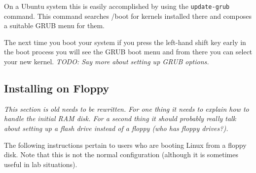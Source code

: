 \documentclass{article}
\newcommand{\command}[1]{\texttt{#1}}    %
\newcommand{\todo}[1]{\textit{TODO: #1}}
\begin{document}
On a Ubuntu system this is easily accomplished by using the \command{update-grub} command. This
command searches /boot for kernels installed there and composes a suitable GRUB menu for them.

The next time you boot your system if you press the left-hand shift key early in the boot
process you will see the GRUB boot menu and from there you can select your new kernel. \todo{Say
  more about setting up GRUB options.}

\subsection{Installing on Floppy}

\textit{This section is old needs to be rewritten. For one thing it needs to explain how to
  handle the initial RAM disk. For a second thing it should probably really talk about setting
  up a flash drive instead of a floppy (who has floppy drives?).}

The following instructions pertain to users who are booting Linux from a floppy disk. Note that
this is not the normal configuration (although it is sometimes useful in lab situations).
\end{document}
